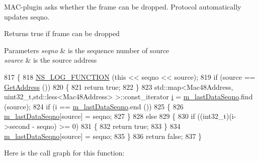 M\+A\+C-\/plugin asks whether the frame can be dropped. Protocol automatically updates seqno. 

\begin{DoxyReturn}{Returns}
true if frame can be dropped 
\end{DoxyReturn}

\begin{DoxyParams}{Parameters}
{\em seqno} & is the sequence number of source \\
\hline
{\em source} & is the source address \\
\hline
\end{DoxyParams}

\begin{DoxyCode}
817 \{
818   \hyperlink{log-macros-disabled_8h_a90b90d5bad1f39cb1b64923ea94c0761}{NS\_LOG\_FUNCTION} (\textcolor{keyword}{this} << seqno << source);
819   \textcolor{keywordflow}{if} (source == \hyperlink{classns3_1_1dot11s_1_1HwmpProtocol_ab8b2c6d98ae278406f543e25feca8ccc}{GetAddress} ())
820     \{
821       \textcolor{keywordflow}{return} \textcolor{keyword}{true};
822     \}
823   std::map<Mac48Address, uint32\_t,std::less<Mac48Address> >::const\_iterator \hyperlink{bernuolliDistribution_8m_a6f6ccfcf58b31cb6412107d9d5281426}{i} = 
      \hyperlink{classns3_1_1dot11s_1_1HwmpProtocol_aeb887a8a8e95dcfc1ed9f37cbbe1a97c}{m\_lastDataSeqno}.find (source);
824   \textcolor{keywordflow}{if} (i == \hyperlink{classns3_1_1dot11s_1_1HwmpProtocol_aeb887a8a8e95dcfc1ed9f37cbbe1a97c}{m\_lastDataSeqno}.end ())
825     \{
826       \hyperlink{classns3_1_1dot11s_1_1HwmpProtocol_aeb887a8a8e95dcfc1ed9f37cbbe1a97c}{m\_lastDataSeqno}[source] = seqno;
827     \}
828   \textcolor{keywordflow}{else}
829     \{
830       \textcolor{keywordflow}{if} ((int32\_t)(i->second - seqno)  >= 0)
831         \{
832           \textcolor{keywordflow}{return} \textcolor{keyword}{true};
833         \}
834       \hyperlink{classns3_1_1dot11s_1_1HwmpProtocol_aeb887a8a8e95dcfc1ed9f37cbbe1a97c}{m\_lastDataSeqno}[source] = seqno;
835     \}
836   \textcolor{keywordflow}{return} \textcolor{keyword}{false};
837 \}
\end{DoxyCode}


Here is the call graph for this function\+:


